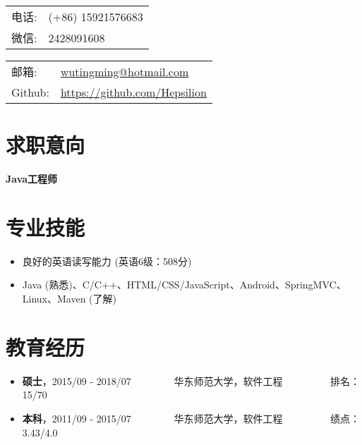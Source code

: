 \documentclass[letterpaper, UTF8, 11pt]{article}
\def\name{\textbf{\textcolor[rgb]{0.00, 0.00, 0.00}{\fontsize{30pt}{30pt}吴庭明}} ~~~~~~~~~ \fontsize{15pt}{15pt}}
\begin{document}
	
	\noindent{\bf \name} 
	\vspace{0.1in}

	\begin{minipage}{0.45\linewidth}
		\begin{tabular}{ll}
			电话:   & (+86) 15921576683 \\
			微信:   & 2428091608 \\
		\end{tabular}
	\end{minipage}
	\begin{minipage}{0.45\linewidth}
		\begin{tabular}{ll}
			邮箱:   & \href{mailto:wutingming@hotmail.com}{ wutingming@hotmail.com} \\
			Github: & \href{https://github.com/Hepsilion}{https://github.com/Hepsilion}\\
		\end{tabular}
	\end{minipage}
	\vspace{-0.1in}
	
	\section*{\textbf{求职意向}}\vspace{-0.15in}
		\textbf{Java工程师}
	\vspace{-0.25in}
	
	\section*{\textbf{专业技能}}\vspace{-0.15in}
	\begin{itemize}
		\item 良好的英语读写能力 (英语6级：508分)
		\item Java (熟悉)、C/C++、HTML/CSS/JavaScript、Android、SpringMVC、Linux、Maven (了解)
	\end{itemize}
	\vspace{-0.3in}
	
	\section*{\textbf{教育经历}}\vspace{-0.15in}
	\begin{itemize}
		\item \textbf{硕士}，2015/09 - 2018/07 ~~~~~~~~华东师范大学，软件工程  ~~~~~~~~~排名：15/70
		\item \textbf{本科}，2011/09 - 2015/07 ~~~~~~~~华东师范大学，软件工程  ~~~~~~~~~绩点：3.43/4.0
	\end{itemize}
	\vspace{-0.3in}
	
\end{document}
